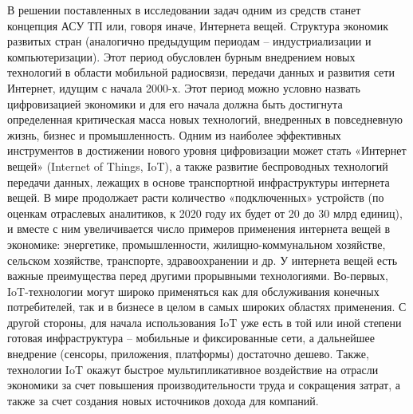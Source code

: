 В решении поставленных в исследовании задач одним из средств станет концепция АСУ ТП или, говоря иначе, Интернета вещей.
Структура экономик развитых стран (аналогично предыдущим периодам – индустриализации и компьютеризации). Этот период обусловлен бурным внедрением новых технологий в области мобильной радиосвязи, передачи данных и развития сети Интернет, идущим с начала 2000-х. Этот период можно условно назвать цифровизацией экономики и для его начала должна быть достигнута определенная критическая масса новых технологий, внедренных в повседневную жизнь, бизнес и промышленность.
Одним из наиболее эффективных инструментов в достижении нового уровня цифровизации может стать «Интернет вещей» (Internet of Things, IoT), а также развитие беспроводных технологий передачи данных, лежащих в основе транспортной инфраструктуры интернета вещей. В мире продолжает расти количество «подключенных» устройств (по оценкам отраслевых аналитиков, к 2020 году их будет от 20 до 30 млрд единиц), и вместе с ним увеличивается число примеров применения интернета вещей в экономике: энергетике, промышленности, жилищно-коммунальном хозяйстве, сельском хозяйстве, транспорте, здравоохранении и др.
У интернета вещей есть важные преимущества перед другими прорывными технологиями. Во-первых, IoT-технологии могут широко применяться как для обслуживания конечных потребителей, так и в бизнесе в целом в самых широких областях применения. С другой стороны, для начала использования IoT уже есть в той или иной степени готовая инфраструктура – мобильные и фиксированные сети, а дальнейшее внедрение (сенсоры, приложения, платформы) достаточно дешево. Также, технологии IoT окажут быстрое мультипликативное воздействие на отрасли экономики за счет повышения производительности труда и сокращения затрат, а также за счет создания новых источников дохода для компаний.







